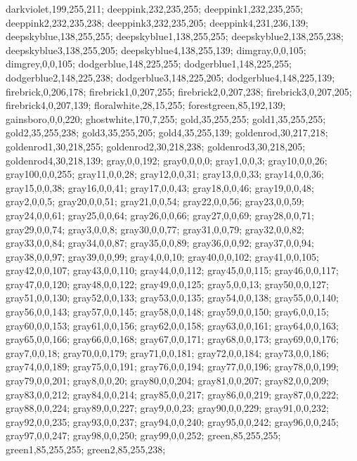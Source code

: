 {darkviolet,199,255,211;%
deeppink,232,235,255;%
deeppink1,232,235,255;%
deeppink2,232,235,238;%
deeppink3,232,235,205;%
deeppink4,231,236,139;%
deepskyblue,138,255,255;%
deepskyblue1,138,255,255;%
deepskyblue2,138,255,238;%
deepskyblue3,138,255,205;%
deepskyblue4,138,255,139;%
dimgray,0,0,105;%
dimgrey,0,0,105;%
dodgerblue,148,225,255;%
dodgerblue1,148,225,255;%
dodgerblue2,148,225,238;%
dodgerblue3,148,225,205;%
dodgerblue4,148,225,139;%
firebrick,0,206,178;%
firebrick1,0,207,255;%
firebrick2,0,207,238;%
firebrick3,0,207,205;%
firebrick4,0,207,139;%
floralwhite,28,15,255;%
forestgreen,85,192,139;%
gainsboro,0,0,220;%
ghostwhite,170,7,255;%
gold,35,255,255;%
gold1,35,255,255;%
gold2,35,255,238;%
gold3,35,255,205;%
gold4,35,255,139;%
goldenrod,30,217,218;%
goldenrod1,30,218,255;%
goldenrod2,30,218,238;%
goldenrod3,30,218,205;%
goldenrod4,30,218,139;%
gray,0,0,192;%
gray0,0,0,0;%
gray1,0,0,3;%
gray10,0,0,26;%
gray100,0,0,255;%
gray11,0,0,28;%
gray12,0,0,31;%
gray13,0,0,33;%
gray14,0,0,36;%
gray15,0,0,38;%
gray16,0,0,41;%
gray17,0,0,43;%
gray18,0,0,46;%
gray19,0,0,48;%
gray2,0,0,5;%
gray20,0,0,51;%
gray21,0,0,54;%
gray22,0,0,56;%
gray23,0,0,59;%
gray24,0,0,61;%
gray25,0,0,64;%
gray26,0,0,66;%
gray27,0,0,69;%
gray28,0,0,71;%
gray29,0,0,74;%
gray3,0,0,8;%
gray30,0,0,77;%
gray31,0,0,79;%
gray32,0,0,82;%
gray33,0,0,84;%
gray34,0,0,87;%
gray35,0,0,89;%
gray36,0,0,92;%
gray37,0,0,94;%
gray38,0,0,97;%
gray39,0,0,99;%
gray4,0,0,10;%
gray40,0,0,102;%
gray41,0,0,105;%
gray42,0,0,107;%
gray43,0,0,110;%
gray44,0,0,112;%
gray45,0,0,115;%
gray46,0,0,117;%
gray47,0,0,120;%
gray48,0,0,122;%
gray49,0,0,125;%
gray5,0,0,13;%
gray50,0,0,127;%
gray51,0,0,130;%
gray52,0,0,133;%
gray53,0,0,135;%
gray54,0,0,138;%
gray55,0,0,140;%
gray56,0,0,143;%
gray57,0,0,145;%
gray58,0,0,148;%
gray59,0,0,150;%
gray6,0,0,15;%
gray60,0,0,153;%
gray61,0,0,156;%
gray62,0,0,158;%
gray63,0,0,161;%
gray64,0,0,163;%
gray65,0,0,166;%
gray66,0,0,168;%
gray67,0,0,171;%
gray68,0,0,173;%
gray69,0,0,176;%
gray7,0,0,18;%
gray70,0,0,179;%
gray71,0,0,181;%
gray72,0,0,184;%
gray73,0,0,186;%
gray74,0,0,189;%
gray75,0,0,191;%
gray76,0,0,194;%
gray77,0,0,196;%
gray78,0,0,199;%
gray79,0,0,201;%
gray8,0,0,20;%
gray80,0,0,204;%
gray81,0,0,207;%
gray82,0,0,209;%
gray83,0,0,212;%
gray84,0,0,214;%
gray85,0,0,217;%
gray86,0,0,219;%
gray87,0,0,222;%
gray88,0,0,224;%
gray89,0,0,227;%
gray9,0,0,23;%
gray90,0,0,229;%
gray91,0,0,232;%
gray92,0,0,235;%
gray93,0,0,237;%
gray94,0,0,240;%
gray95,0,0,242;%
gray96,0,0,245;%
gray97,0,0,247;%
gray98,0,0,250;%
gray99,0,0,252;%
green,85,255,255;%
green1,85,255,255;%
green2,85,255,238;%
}
